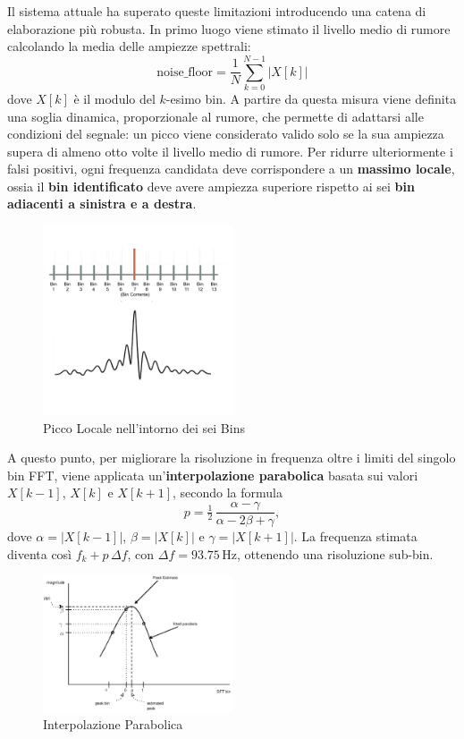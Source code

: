 Il sistema attuale ha superato queste limitazioni introducendo una catena di elaborazione più robusta.
 In primo luogo viene stimato il livello medio di rumore calcolando la media delle ampiezze spettrali:
\[
\text{noise\_floor} = \frac{1}{N}\sum_{k=0}^{N-1} |X[k]|
\]
dove $X[k]$ è il modulo del $k$-esimo bin. A partire da questa misura viene definita una soglia dinamica, 
proporzionale al rumore, che permette di adattarsi alle condizioni del segnale: un picco viene considerato 
valido solo se la sua ampiezza supera di almeno otto volte il livello medio di rumore. Per ridurre ulteriormente 
i falsi positivi, ogni frequenza candidata deve corrispondere a un \textbf{massimo locale}, ossia il \textbf{bin identificato}
 deve avere ampiezza superiore rispetto ai sei \textbf{bin adiacenti a sinistra e a destra}. \\
 \begin{figure}[H]
    \centering
    \includegraphics[width=0.5\textwidth]{immagini/local_peak.png}
    \caption{Picco Locale nell'intorno dei sei Bins}
    \label{fig:bins_local_peak}
\end{figure}
 A questo punto, per migliorare 
 la risoluzione in frequenza oltre i limiti del singolo bin FFT, viene applicata un’\textbf{interpolazione parabolica} basata
  sui valori $X[k-1]$, $X[k]$ e $X[k+1]$, secondo la formula
\[
p = \tfrac{1}{2}\,\frac{\alpha - \gamma}{\alpha - 2\beta + \gamma},
\]
dove $\alpha = |X[k-1]|$, $\beta = |X[k]|$ e $\gamma = |X[k+1]|$. La frequenza stimata diventa così $f_k + p\,\Delta f$, con $\Delta f = 93.75\,\text{Hz}$, 
ottenendo una risoluzione sub-bin.\\ 
\begin{figure}[H]
    \centering
    \includegraphics[width=0.5\textwidth]{immagini/parabolic_interpolation.png}
    \caption{Interpolazione Parabolica \cite{QuadraticInterpolationSpectralPeaks}}
    \label{fig:interpolazione_parabolica}
\end{figure}
